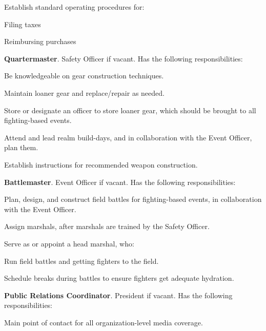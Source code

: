 \documentclass[12pt]{article}
\begin{document}
\begin{level}
\begin{level}
\begin{level}
        \item Establish standard operating procedures for:
        \begin{level}
            \item Filing taxes
            \item Reimbursing purchases
        \end{level}
    \end{level}
    \item \textbf{Quartermaster}. Safety Officer if vacant. Has the following responsibilities:
    \begin{level}
        \item Be knowledgeable on gear construction techniques.
        \item Maintain loaner gear and replace/repair as needed.
        \item Store or designate an officer to store loaner gear, which should be brought to all fighting-based events.
        \item Attend and lead realm build-days, and in collaboration with the Event Officer, plan them.
        \item Establish instructions for recommended weapon construction.
    \end{level}
    \item \textbf{Battlemaster}. Event Officer if vacant. Has the following responsibilities:
    \begin{level}
        \item Plan, design, and construct field battles for fighting-based events, in collaboration with the Event Officer.
        \item Assign marshals, after marshals are trained by the Safety Officer.
        \item Serve as or appoint a head marshal, who:
        \begin{level}
            \item Run field battles and getting fighters to the field.
            \item Schedule breaks during battles to ensure fighters get adequate hydration.
        \end{level}
    \end{level}
    \item \textbf{Public Relations Coordinator}. President if vacant. Has the following responsibilities:
    \begin{level}
        \item Main point of contact for all organization-level media coverage.

\end{level}
\end{level}
\end{level}
\end{document}
